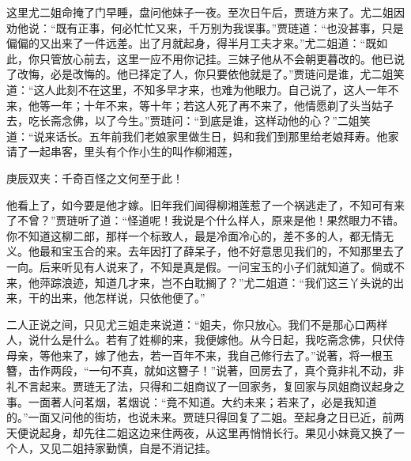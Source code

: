 \begin{parag}
    这里尤二姐命掩了门早睡，盘问他妹子一夜。至次日午后，贾琏方来了。尤二姐因劝他说：“既有正事，何必忙忙又来，千万别为我误事。”贾琏道：“也没甚事，只是偏偏的又出来了一件远差。出了月就起身，得半月工夫才来。”尤二姐道：“既如此，你只管放心前去，这里一应不用你记挂。三妹子他从不会朝更暮改的。他已说了改悔，必是改悔的。他已择定了人，你只要依他就是了。”贾琏问是谁，尤二姐笑道：“这人此刻不在这里，不知多早才来，也难为他眼力。自己说了，这人一年不来，他等一年；十年不来，等十年；若这人死了再不来了，他情愿剃了头当姑子去，吃长斋念佛，以了今生。”贾琏问：“到底是谁，这样动他的心？”二姐笑道：“说来话长。五年前我们老娘家里做生日，妈和我们到那里给老娘拜寿。他家请了一起串客，里头有个作小生的叫作柳湘莲，\begin{note}庚辰双夹：千奇百怪之文何至于此！\end{note}他看上了，如今要是他才嫁。旧年我们闻得柳湘莲惹了一个祸逃走了，不知可有来了不曾？”贾琏听了道：“怪道呢！我说是个什么样人，原来是他！果然眼力不错。你不知道这柳二郎，那样一个标致人，最是冷面冷心的，差不多的人，都无情无义。他最和宝玉合的来。去年因打了薛呆子，他不好意思见我们的，不知那里去了一向。后来听见有人说来了，不知是真是假。一问宝玉的小子们就知道了。倘或不来，他萍踪浪迹，知道几才来，岂不白耽搁了？”尤二姐道：“我们这三丫头说的出来，干的出来，他怎样说，只依他便了。”
\end{parag}


\begin{parag}
    二人正说之间，只见尤三姐走来说道：“姐夫，你只放心。我们不是那心口两样人，说什么是什么。若有了姓柳的来，我便嫁他。从今日起，我吃斋念佛，只伏侍母亲，等他来了，嫁了他去，若一百年不来，我自己修行去了。”说著，将一根玉簪，击作两段，“一句不真，就如这簪子！”说著，回房去了，真个竟非礼不动，非礼不言起来。贾琏无了法，只得和二姐商议了一回家务，复回家与凤姐商议起身之事。一面著人问茗烟，茗烟说：“竟不知道。大约未来；若来了，必是我知道的。”一面又问他的街坊，也说未来。贾琏只得回复了二姐。至起身之日已近，前两天便说起身，却先往二姐这边来住两夜，从这里再悄悄长行。果见小妹竟又换了一个人，又见二姐持家勤慎，自是不消记挂。
\end{parag}


